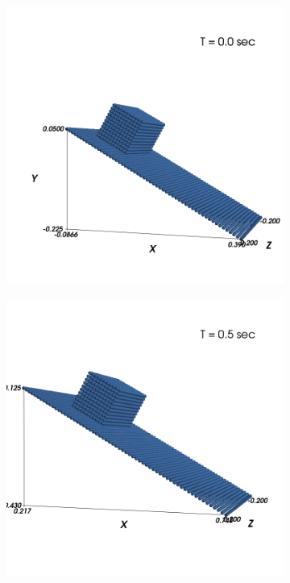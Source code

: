 \begin{figure}[!htpb]
  \centering
  \begin{subfigure}{0.48\textwidth}
    \centering
    \includegraphics[width=1.0\textwidth]{figures/rfc/figures/mohseni_2021_free_sliding_on_a_slope_3d/fric_coeff_0_2/time0}
    \label{fig:passing-0}
  \end{subfigure}
  \begin{subfigure}{0.48\textwidth}
    \centering
    \includegraphics[width=1.0\textwidth]{figures/rfc/figures/mohseni_2021_free_sliding_on_a_slope_3d/fric_coeff_0_2/time1}
    \label{fig:passing-1}
  \end{subfigure}


\end{figure}
